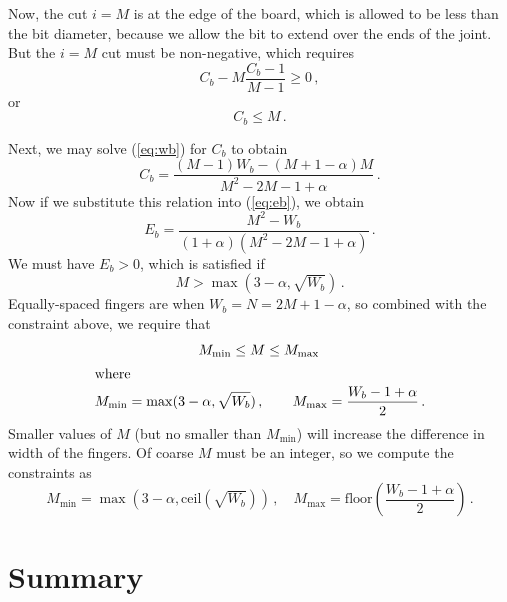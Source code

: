 \documentclass[12pt,final]{article}
\begin{document}
Now, the cut $i=M$ is at the edge of the board, which is allowed to be less
than the bit diameter, because we allow the bit to extend over the ends of the
joint.  But the $i=M$ cut must be non-negative, which requires
\begin{equation}
  C_b - M \frac{C_b - 1}{M-1} \ge 0\,,
\end{equation}
or
\begin{equation}
  C_b \le M\,.
\end{equation}

Next, we may solve (\ref{eq:wb}) for $C_b$ to obtain
\begin{equation}
  \label{eq:cb}
  C_b = \frac{(M-1)W_b - (M+1-\alpha)M}{M^2 - 2M - 1 + \alpha}\,.
\end{equation}
Now if we substitute this relation into (\ref{eq:eb}), we obtain
\begin{equation}
  E_b = \frac{M^2 - W_b}{(1 + \alpha)(M^2 - 2M - 1 + \alpha)}\,.
\end{equation}
We must have $E_b > 0$, which is satisfied if
\begin{equation}
  M > \max(3 - \alpha, \sqrt{W_b})\,.
\end{equation}
Equally-spaced fingers are when $W_b = N = 2M + 1 - \alpha$, so combined with
the constraint above, we require that
\begin{gather}
  M_{\min} \le M \le M_{\max}\,\\
\intertext{where}
M_{\min} = \max(3 - \alpha, \sqrt{W_b})\,, \qquad
  M_{\max} = \frac{W_b - 1 + \alpha}{2}\,.
\end{gather}
Smaller values of $M$ (but no smaller than $M_{\min}$) will increase 
the difference in width of the fingers.  Of coarse $M$ must be an integer, so
we compute the constraints as
\begin{equation}
\label{eq:mConstraints}
M_{\min} = \max\left(3-\alpha, \text{ceil}\left(\sqrt{W_b}\right)\right)\,, \quad
  M_{\max} = \text{floor}\left(\frac{W_b - 1 + \alpha}{2}\right)\,.
\end{equation}

\section{Summary}
\end{document}
